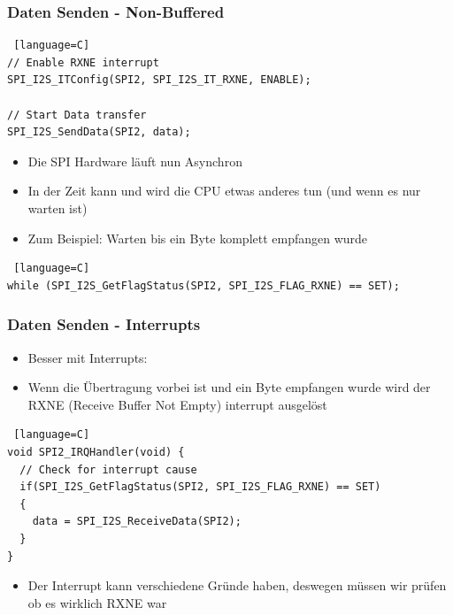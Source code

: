 \documentclass[ngerman,compress]{beamer}
\begin{document}
\begin{frame} [fragile]
	\frametitle{Daten Senden - Non-Buffered}
	\begin{lstlisting} [language=C]
// Enable RXNE interrupt
SPI_I2S_ITConfig(SPI2, SPI_I2S_IT_RXNE, ENABLE);

// Start Data transfer
SPI_I2S_SendData(SPI2, data);
	\end{lstlisting}
	\begin{itemize}
		\item Die SPI Hardware läuft nun Asynchron
		\item In der Zeit kann und wird die CPU etwas anderes tun (und wenn es nur warten ist)
		\item Zum Beispiel: Warten bis ein Byte komplett empfangen wurde
	\end{itemize}
	\begin{lstlisting} [language=C]
while (SPI_I2S_GetFlagStatus(SPI2, SPI_I2S_FLAG_RXNE) == SET);
	\end{lstlisting}
\end{frame}

\begin{frame} [fragile]
	\frametitle{Daten Senden - Interrupts}
	\begin{itemize}
		\item Besser mit Interrupts:
		\item Wenn die Übertragung vorbei ist und ein Byte empfangen wurde wird der RXNE
			(Receive Buffer Not Empty) interrupt ausgelöst
	\end{itemize}
	\begin{lstlisting} [language=C]
void SPI2_IRQHandler(void) {
  // Check for interrupt cause
  if(SPI_I2S_GetFlagStatus(SPI2, SPI_I2S_FLAG_RXNE) == SET)
  {
    data = SPI_I2S_ReceiveData(SPI2);
  }
}
	\end{lstlisting}
	\begin{itemize}
		\item Der Interrupt kann verschiedene Gründe haben, deswegen müssen wir prüfen ob es
			wirklich RXNE war
	\end{itemize}
\end{frame}
\end{document}
